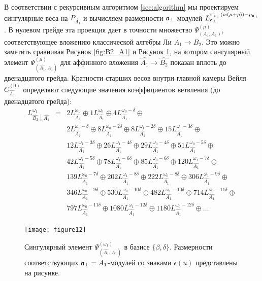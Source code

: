 В соответствии с рекурсивным алгоритмом  \ref{sec:algorithm} мы проектируем сингулярные веса на $P_{\hat{A_1}}$ и вычисляем размерности $\mathfrak{a}_{\perp}$-модулей $L^{\pi_{\mathfrak{a}_{\perp}}(w(\mu+\rho))-\rho_{\mathfrak{a}_{\perp}}}_{\mathfrak{a}_{\perp}}$. В нулевом грейде эта проекция дает в точности множество $\Psi ^{\left( \mu \right) }_{\left(  A_1, A_1 \right)}$, соответствующее вложению классической алгебры Ли  $A_1\rightarrow B_2$. Это можно заметить сравнивая Рисунок \ref{fig:B2_A1} и Рисунок \ref{fig:AffineB2_A1_anom_proj}, на котором сингулярный элемент $\Psi ^{\left( \mu \right) }_{\left(  \widehat{A_1}, A_1 \right)}$ для аффинного вложения  $\hat{A_1}\to\hat{B_{2}}$  показан вплоть до двенадцатого грейда. Кратности старших весов внутри главной камеры Вейля
$\bar{C}^{\left( 0 \right)}_{\hat{A_1}}$ определяют следующие значения коэффициентов ветвления (до двенадцатого грейда):
\begin{eqnarray*}
  \label{eq:28}
  L^{\omega_1}_{\hat{B_2}\downarrow \hat{A_1}}
  &=&2 L_{\hat{A_1}}^{\omega_1}\oplus 1 L_{\hat{A_1}}^{\omega_0}\oplus 4 L_{\hat{A_1}}^{\omega_0-\delta}\oplus\\
    &&2 L_{\hat{A_1}}^{\omega_1-\delta}\oplus 8 L_{\hat{A_1}}^{\omega_0-2\delta}\oplus
    8 L_{\hat{A_1}}^{\omega_1-2\delta}\oplus 15 L_{\hat{A_1}}^{\omega_0-3\delta}\oplus\\
    &&12 L_{\hat{A_1}}^{\omega_1-3\delta}\oplus 26 L_{\hat{A_1}}^{\omega_1-4\delta}\oplus
    29 L_{\hat{A_1}}^{\omega_0-4\delta}\oplus 51 L_{\hat{A_1}}^{\omega_0-5\delta}\oplus\\
    &&42 L_{\hat{A_1}}^{\omega_1-5\delta}\oplus 78 L_{\hat{A_1}}^{\omega_1-6\delta}\oplus
    85 L_{\hat{A_1}}^{\omega_0-6\delta}\oplus 120 L_{\hat{A_1}}^{\omega_1-7\delta}\oplus\\
    &&139 L_{\hat{A_1}}^{\omega_0-7\delta}\oplus 202 L_{\hat{A_1}}^{\omega_1-8\delta}\oplus
    222 L_{\hat{A_1}}^{\omega_0-8\delta}\oplus 306 L_{\hat{A_1}}^{\omega_1-9\delta}\oplus\\
    &&346 L_{\hat{A_1}}^{\omega_0-9\delta}\oplus 530 L_{\hat{A_1}}^{\omega_0-10\delta}\oplus
    482 L_{\hat{A_1}}^{\omega_1-10\delta}\oplus 714 L_{\hat{A_1}}^{\omega_1-11\delta}\oplus\\
    &&797 L_{\hat{A_1}}^{\omega_0-11\delta}\oplus 1080 L_{\hat{A_1}}^{\omega_1-12\delta}\oplus
    1180 L_{\hat{A_1}}^{\omega_0-12\delta}\oplus \dots
\end{eqnarray*}
\begin{figure}[h!tb]
  \centering
  \texttt{[image: figure12]}
  \caption{Сингулярный элемент $\Psi ^{\left( \omega_1 \right) }_{\left(  \widehat{A_1}, A_1 \right)}$ в базисе $\{\beta,\delta\}$. Размерности соответствующих  $\mathfrak{a}_{\perp}=A_1$-модулей со знаками  $\epsilon(u)$ представлены на рисунке.}
  \label{fig:AffineB2_A1_anom_proj}
\end{figure}

